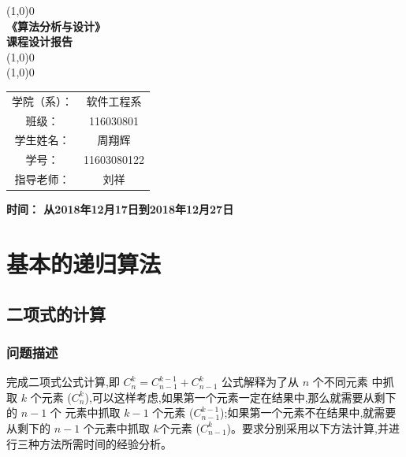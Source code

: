 \documentclass{ctexart}
\begin{document}
\begin{titlepage}
    \begin{center}
        \line(1,0){0} \\
        [0.25in]
        \huge{\bfseries 《算法分析与设计》} \\
        [0.25in]
        \huge{\bfseries 课程设计报告} \\
        \line(1,0){0} \\
        [2mm]
        \line(1,0){0} \\
        [5cm]
        {
        \begin{tabular}{cc}
            学院（系）： & 软件工程系 \\
            班级： & 116030801 \\
            学生姓名： &  周翔辉\\
            学号： & 11603080122 \\
            指导老师： &刘祥 \\
            [2cm]
        \end{tabular}

        {\bfseries 时间： 从2018年12月17日到2018年12月27日}\\
        }
    \end{center}
\end{titlepage}

\tableofcontents
\cleardoublepage

\newpage
{}

\setcounter{page}{1}

\section{基本的递归算法}
\subsection{二项式的计算}
\subsubsection{问题描述}
完成二项式公式计算,即 $C_n^k = C_{n-1}^{k-1} + C_{n-1}^k$ 公式解释为了从 $n$ 个不同元素
中抓取 $k$ 个元素 ($C_n^k$),可以这样考虑,如果第一个元素一定在结果中,那么就需要从剩下的 $n-1$ 个
元素中抓取 $k-1$ 个元素 ($C_{n-1}^{k-1}$);如果第一个元素不在结果中,就需要从剩下的 $n-1$ 个元素中抓取 $k$个元素
($C_{n-1}^k$)。要求分别采用以下方法计算,并进行三种方法所需时间的经验分析。
\end{document}

